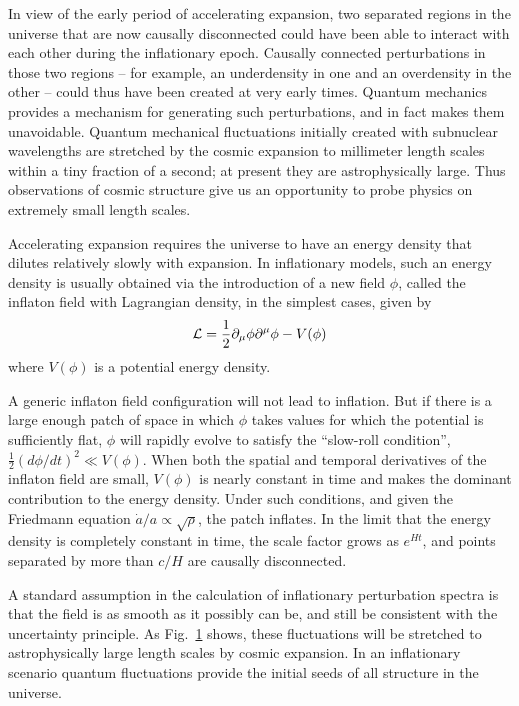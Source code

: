 \begin{figure}[ht]
{}
\label{fig:PTfigs}
\end{figure}


In view of the early period of accelerating expansion, two separated regions in the universe that are now causally disconnected could have been able to interact with each other during the inflationary epoch. Causally connected perturbations in those two regions -- for example, an underdensity in one and an overdensity in the other -- could thus have been created at very early times. Quantum mechanics provides a mechanism for generating such perturbations, and in fact makes them unavoidable. Quantum mechanical fluctuations initially created with subnuclear wavelengths are stretched by the cosmic expansion to millimeter length scales within a tiny fraction of a second; at present they are astrophysically large. Thus observations of cosmic structure give us an opportunity to probe physics on extremely small length scales.

Accelerating expansion requires the universe to have an energy density that dilutes relatively slowly with expansion. In inflationary models, such an energy density is usually obtained via the introduction of a new field $\phi$, called the inflaton field with Lagrangian density, in the simplest cases, given by
\begin{equation}
{\cal L} = \frac{1}{2} \partial_\mu \phi \partial^\mu \phi - V(\phi)
\end{equation}
where $V(\phi)$ is a potential energy density. 

A generic inflaton field configuration will not lead to inflation. But if there is a large enough patch of space in which $\phi$ takes values for which the potential is sufficiently flat, $\phi$ will rapidly evolve to satisfy the ``slow-roll condition'', $\frac{1}{2} \left(d\phi/dt\right)^2 \ll V(\phi)$. When both the spatial and temporal derivatives of the inflaton field are small, $V(\phi)$ is nearly constant in time and makes the dominant contribution to the energy density. Under such conditions, and given the Friedmann equation $\dot a/a \propto \sqrt{\rho}$, the patch inflates. In the limit that the energy density is completely constant in time, the scale factor grows as $e^{H t}$, and points separated by more than $c/H$ are causally disconnected.

A standard assumption in the calculation of inflationary perturbation spectra is that the field is as smooth as it possibly can be, and still be consistent with the uncertainty principle. As Fig.~\ref{fig:PTfigs} shows, these fluctuations will be stretched to astrophysically large length scales by cosmic expansion. In an inflationary scenario quantum fluctuations provide the initial seeds of all structure in the universe. 

